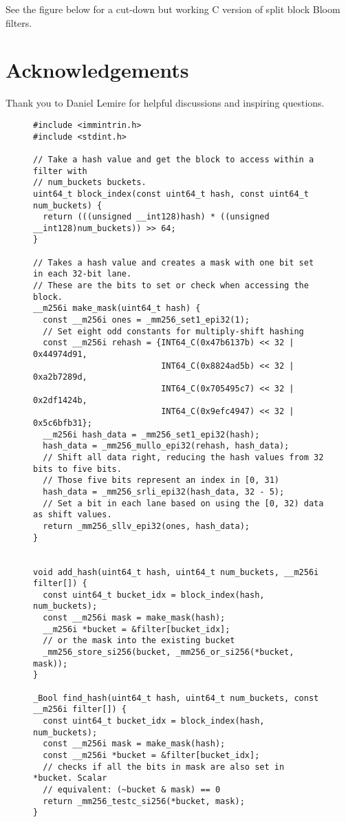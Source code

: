 \documentclass[letterpaper, 11pt]{article}
\begin{document}
See the figure below for a cut-down but working C version of split block Bloom filters.

\section*{Acknowledgements}
Thank you to Daniel Lemire for helpful discussions and inspiring questions.




\appendix{}
\begin{figure}
  \begin{framed}
\begin{verbatim}
#include <immintrin.h>
#include <stdint.h>

// Take a hash value and get the block to access within a filter with
// num_buckets buckets.
uint64_t block_index(const uint64_t hash, const uint64_t num_buckets) {
  return (((unsigned __int128)hash) * ((unsigned __int128)num_buckets)) >> 64;
}

// Takes a hash value and creates a mask with one bit set in each 32-bit lane.
// These are the bits to set or check when accessing the block.
__m256i make_mask(uint64_t hash) {
  const __m256i ones = _mm256_set1_epi32(1);
  // Set eight odd constants for multiply-shift hashing
  const __m256i rehash = {INT64_C(0x47b6137b) << 32 | 0x44974d91,
                          INT64_C(0x8824ad5b) << 32 | 0xa2b7289d,
                          INT64_C(0x705495c7) << 32 | 0x2df1424b,
                          INT64_C(0x9efc4947) << 32 | 0x5c6bfb31};
  __m256i hash_data = _mm256_set1_epi32(hash);
  hash_data = _mm256_mullo_epi32(rehash, hash_data);
  // Shift all data right, reducing the hash values from 32 bits to five bits.
  // Those five bits represent an index in [0, 31)
  hash_data = _mm256_srli_epi32(hash_data, 32 - 5);
  // Set a bit in each lane based on using the [0, 32) data as shift values.
  return _mm256_sllv_epi32(ones, hash_data);
}


void add_hash(uint64_t hash, uint64_t num_buckets, __m256i filter[]) {
  const uint64_t bucket_idx = block_index(hash, num_buckets);
  const __m256i mask = make_mask(hash);
  __m256i *bucket = &filter[bucket_idx];
  // or the mask into the existing bucket
  _mm256_store_si256(bucket, _mm256_or_si256(*bucket, mask));
}

_Bool find_hash(uint64_t hash, uint64_t num_buckets, const __m256i filter[]) {
  const uint64_t bucket_idx = block_index(hash, num_buckets);
  const __m256i mask = make_mask(hash);
  const __m256i *bucket = &filter[bucket_idx];
  // checks if all the bits in mask are also set in *bucket. Scalar
  // equivalent: (~bucket & mask) == 0
  return _mm256_testc_si256(*bucket, mask);
}
\end{verbatim}
  \end{framed}
\end{figure}
\end{document}
